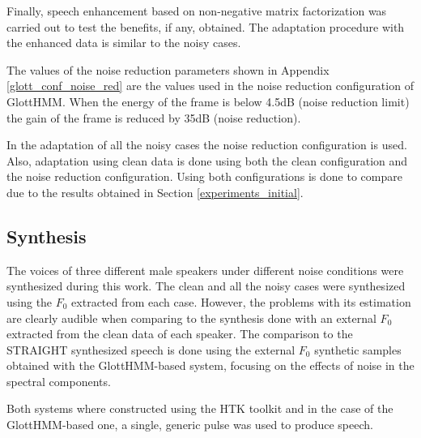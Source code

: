 Finally, speech enhancement based on non-negative matrix factorization \cite{raj_interspeech2010} was carried out to test the benefits, if any, obtained.
%
The adaptation procedure with the enhanced data is similar to the noisy cases.

The values of the noise reduction parameters shown in Appendix \ref{glott_conf_noise_red} are the values used in the noise reduction configuration of GlottHMM.
%
When the energy of the frame is below 4.5dB (noise reduction limit) the gain of the frame is reduced by 35dB (noise reduction).

In the adaptation of all the noisy cases the noise reduction configuration is used.
%
Also, adaptation using clean data is done using both the clean configuration and the noise reduction configuration.
%
Using both configurations is done to compare due to the results obtained in Section \ref{experiments_initial}.

\subsection{Synthesis}
\label{experiments_synthesis}
The voices of three different male speakers under different noise conditions were synthesized during this work.
%
The clean and all the noisy cases were synthesized using the $F_{0}$ extracted from each case.
%
However, the problems with its estimation are clearly audible when comparing to the synthesis done with an external $F_{0}$ extracted from the clean data of each speaker.
%
The comparison to the STRAIGHT synthesized speech is done using the external $F_{0}$ synthetic samples obtained with the GlottHMM-based system, focusing on the effects of noise in the spectral components.

Both systems where constructed using the HTK toolkit \cite{young1997htk} and in the case of the GlottHMM-based one, a single, generic pulse was used to produce speech.
